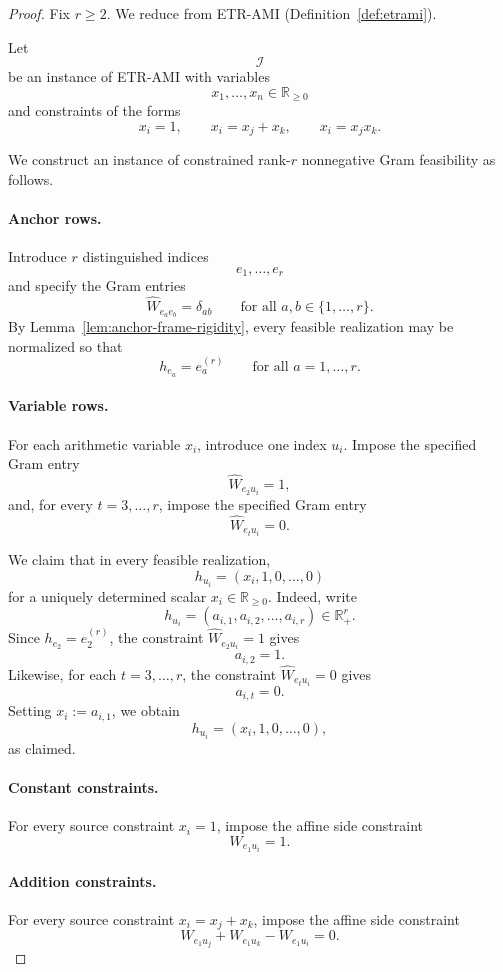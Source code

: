 \documentclass[11pt]{article}
\begin{document}
\begin{proof}
Fix \(r\ge 2\). We reduce from \textsc{ETR-AMI}
(Definition~\ref{def:etrami}).

Let
\[
\mathcal{I}
\]
be an instance of \textsc{ETR-AMI} with variables
\[
x_1,\dots,x_n\in\mathbb{R}_{\ge 0}
\]
and constraints of the forms
\[
x_i=1,\qquad x_i=x_j+x_k,\qquad x_i=x_jx_k.
\]

We construct an instance of constrained rank-$r$ nonnegative Gram feasibility
as follows.

\paragraph{Anchor rows.}
Introduce \(r\) distinguished indices
\[
e_1,\dots,e_r
\]
and specify the Gram entries
\[
\widehat{W}_{e_a e_b}=\delta_{ab}
\qquad \text{for all } a,b\in\{1,\dots,r\}.
\]
By Lemma~\ref{lem:anchor-frame-rigidity}, every feasible realization may be
normalized so that
\[
h_{e_a}=e_a^{(r)}
\qquad \text{for all } a=1,\dots,r.
\]

\paragraph{Variable rows.}
For each arithmetic variable \(x_i\), introduce one index \(u_i\).
Impose the specified Gram entry
\[
\widehat{W}_{e_2 u_i}=1,
\]
and, for every \(t=3,\dots,r\), impose the specified Gram entry
\[
\widehat{W}_{e_t u_i}=0.
\]

We claim that in every feasible realization,
\[
h_{u_i}=(x_i,1,0,\dots,0)
\]
for a uniquely determined scalar \(x_i\in\mathbb{R}_{\ge 0}\).
Indeed, write
\[
h_{u_i}=(a_{i,1},a_{i,2},\dots,a_{i,r})\in\mathbb{R}_+^r.
\]
Since \(h_{e_2}=e_2^{(r)}\), the constraint \(\widehat{W}_{e_2 u_i}=1\) gives
\[
a_{i,2}=1.
\]
Likewise, for each \(t=3,\dots,r\), the constraint
\(\widehat{W}_{e_t u_i}=0\) gives
\[
a_{i,t}=0.
\]
Setting \(x_i:=a_{i,1}\), we obtain
\[
h_{u_i}=(x_i,1,0,\dots,0),
\]
as claimed.

\paragraph{Constant constraints.}
For every source constraint \(x_i=1\), impose the affine side constraint
\[
W_{e_1 u_i}=1.
\]

\paragraph{Addition constraints.}
For every source constraint \(x_i=x_j+x_k\), impose the affine side constraint
\[
W_{e_1 u_j}+W_{e_1 u_k}-W_{e_1 u_i}=0.
\]


\end{proof}
\end{document}
